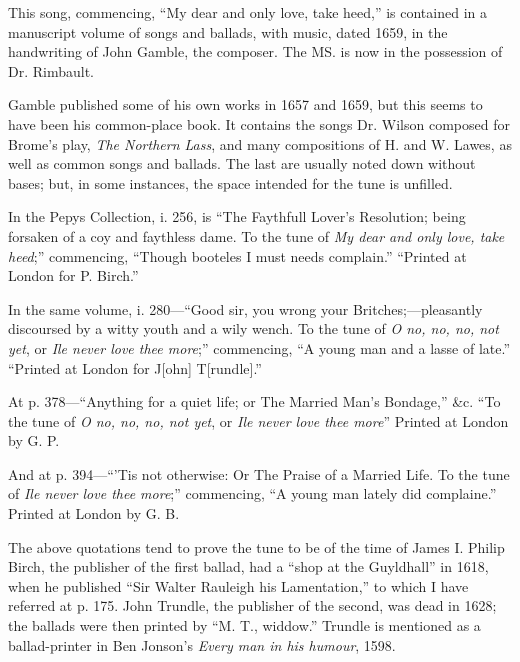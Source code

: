 
This song, commencing, “My dear and only love, take heed,” is contained in a
manuscript volume of songs and ballads, with music, dated 1659, in the handwriting
of John Gamble, the composer. The MS. is now in the possession of
Dr. Rimbault.

Gamble published some of his own works in 1657 and 1659, but this seems to
have been his common-place book. It contains the songs Dr. Wilson composed
for Brome’s play, \textit{The Northern Lass}, and many compositions of H. and W.
Lawes, as well as common songs and ballads. The last are usually noted down
without bases; but, in some instances, the space intended for the tune is unfilled.

In the Pepys Collection, i. 256, is “The Faythfull Lover’s Resolution; being
forsaken of a coy and faythless dame. To the tune of \textit{My dear and only love, take
heed};” commencing, “Though booteles I must needs complain.” “Printed
at London for P. Birch.”

In the same volume, i. 280—“Good sir, you wrong your Britches;—pleasantly
discoursed by a witty youth and a wily wench. To the tune of \textit{O no, no, no, not
yet}, or \textit{Ile never love thee more};” commencing, “A young man and a lasse of
late.” “Printed at London for J[ohn] T[rundle].”

At p. 378—“Anything for a quiet life; or The Married Man’s Bondage,” \&c.
“To the tune of \textit{O no, no, no, not yet}, or \textit{Ile never love thee more}” Printed at
London by G. P.

And at p. 394—“’Tis not otherwise: Or The Praise of a Married Life. To
the tune of \textit{Ile never love thee more};” commencing, “A young man lately did
complaine.” Printed at London by G. B.

The above quotations tend to prove the tune to be of the time of James I.
Philip Birch, the publisher of the first ballad, had a “shop at the Guyldhall”
in 1618, when he published “Sir Walter Rauleigh his Lamentation,” to which
I have referred at p. 175. John Trundle, the publisher of the second, was dead
in 1628; the ballads were then printed by “M. T., widdow.” Trundle is
mentioned as a ballad-printer in Ben Jonson’s \textit{Every man in his humour}, 1598.

